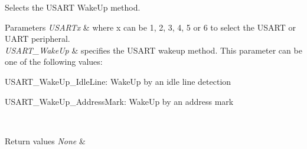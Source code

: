 Selects the U\+S\+A\+RT Wake\+Up method. 


\begin{DoxyParams}{Parameters}
{\em U\+S\+A\+R\+Tx} & where x can be 1, 2, 3, 4, 5 or 6 to select the U\+S\+A\+RT or U\+A\+RT peripheral. \\
\hline
{\em U\+S\+A\+R\+T\+\_\+\+Wake\+Up} & specifies the U\+S\+A\+RT wakeup method. This parameter can be one of the following values\+: \begin{DoxyItemize}
\item U\+S\+A\+R\+T\+\_\+\+Wake\+Up\+\_\+\+Idle\+Line\+: Wake\+Up by an idle line detection \item U\+S\+A\+R\+T\+\_\+\+Wake\+Up\+\_\+\+Address\+Mark\+: Wake\+Up by an address mark \end{DoxyItemize}
\\
\hline
\end{DoxyParams}

\begin{DoxyRetVals}{Return values}
{\em None} & \\
\hline
\end{DoxyRetVals}
